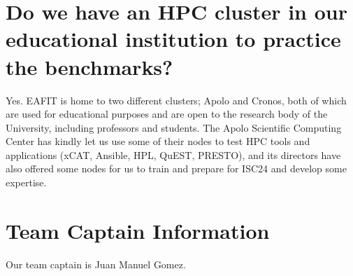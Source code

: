\documentclass[11pt,a4paper,twocolumn]{article}
\begin{document}
    \section{Do we have an HPC cluster in our educational institution to practice the benchmarks?}

    Yes. EAFIT is home to two different clusters; Apolo and Cronos, both of which are used for educational purposes and are open to the research body of the University, including professors and students. The Apolo Scientific Computing Center has kindly let us use some of their nodes to test HPC tools and applications (xCAT, Ansible, HPL, QuEST, PRESTO), and its directors have also offered some nodes for us to train and prepare for ISC24 and develop some expertise.

    \section{Team Captain Information}
    Our team captain is Juan Manuel Gomez.
    
\end{document}
